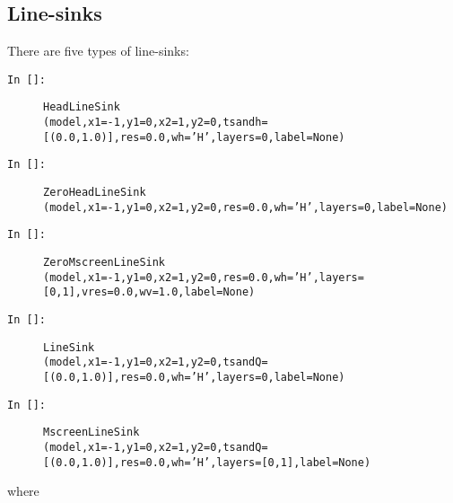 \documentclass [10pt,letterpaper] {article}
\begin{document}
\subsection{Line-sinks}
There are five types of line-sinks:
\begin{description}
\item[{\tt In []:}] {\tt HeadLineSink}\\{\tt(model,x1=-1,y1=0,x2=1,y2=0,tsandh=[(0.0,1.0)],res=0.0,wh='H',layers=0,label=None)}
\item[{\tt In []:}] {\tt ZeroHeadLineSink}\\{\tt(model,x1=-1,y1=0,x2=1,y2=0,res=0.0,wh='H',layers=0,label=None)}
\item[{\tt In []:}] {\tt ZeroMscreenLineSink}\\{\tt(model,x1=-1,y1=0,x2=1,y2=0,res=0.0,wh='H',layers=[0,1],vres=0.0,wv=1.0,label=None)}
\item[{\tt In []:}] {\tt LineSink}\\{\tt(model,x1=-1,y1=0,x2=1,y2=0,tsandQ=[(0.0,1.0)],res=0.0,wh='H',layers=0,label=None)}
\item[{\tt In []:}] {\tt MscreenLineSink}\\{\tt(model,x1=-1,y1=0,x2=1,y2=0,tsandQ=[(0.0,1.0)],res=0.0,wh='H',layers=[0,1],label=None)}

\end{description}
where
\end{document}
